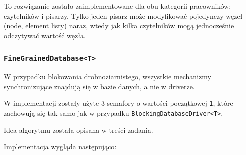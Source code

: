 \documentclass[11pt]{article}
\begin{document}
To rozwiązanie zostało zaimplementowane dla obu kategorii pracowników:
czytelników i pisarzy. Tylko jeden pisarz może modyfikować pojedynczy
węzeł (node, element listy) naraz, wtedy jak kilka czytelników mogą
jednocześnie odczytywać wartość węzła.

    \hypertarget{finegraineddatabaset}{%
\subsubsection{\texorpdfstring{\texttt{FineGrainedDatabase\textless{}T\textgreater{}}}{FineGrainedDatabase\textless T\textgreater{}}}\label{finegraineddatabaset}}

W przypadku blokowania drobnoziarnistego, wszystkie mechanizmy
synchronizujące znajdują się w bazie danych, a nie w driverze.

W implementacji zostały użyte 3 semafory o wartości początkowej
\texttt{1}, które zachowują się tak samo jak w przypadku
\texttt{BlockingDatabaseDriver\textless{}T\textgreater{}}.

Idea algorytmu została opisana w treści zadania.

Implementacja wygląda następująco:
\end{document}

